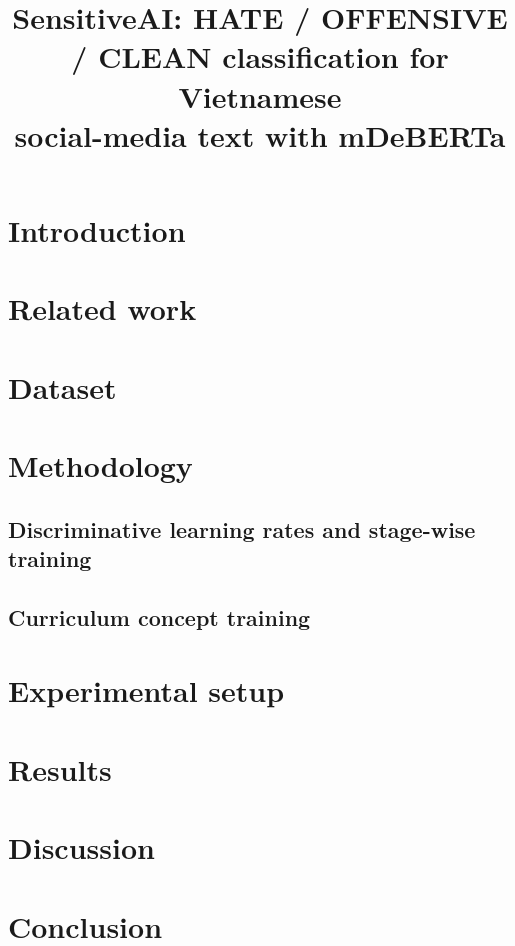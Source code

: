 \documentclass[11pt,a4paper]{article}
\title{\textbf{SensitiveAI:} HATE / OFFENSIVE / CLEAN classification for Vietnamese\\
       social-media text with mDeBERTa}
\author{}
\date{}
\begin{document}
\maketitle

\begin{abstract}

\end{abstract}

\section{Introduction}


\section{Related work}


\section{Dataset}
\label{sec:dataset}


\section{Methodology}
\label{sec:method}


\subsection{Discriminative learning rates and stage-wise training}
\label{sec:dlr}


\subsection{Curriculum concept training}
\label{sec:curriculum}


\section{Experimental setup}
\label{sec:setup}


\section{Results}
\label{sec:results}






\section{Discussion}


\section{Conclusion}




\end{document}
